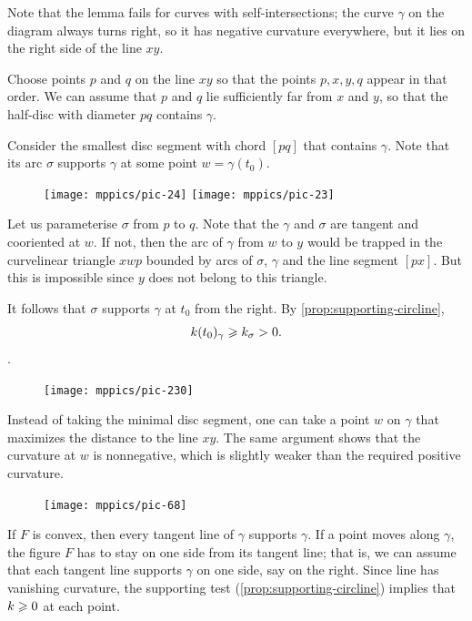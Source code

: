 Note that the lemma fails for curves with self-intersections;
the curve $\gamma$ on the diagram always turns right, 
so it has negative curvature everywhere, but it lies on the right side of the line $xy$.

Choose points $p$ and $q$ on the line $xy$
so that the points $p, x, y, q$ appear in that order.
We can assume that $p$ and $q$ lie sufficiently far from $x$ and $y$, so that the half-disc with diameter $pq$ contains $\gamma$.

Consider the smallest disc segment with chord $[pq]$ that contains $\gamma$.
Note that its arc $\sigma$ supports $\gamma$ at some point $w=\gamma(t_0)$.

\begin{figure}
\centering
\texttt{[image: mppics/pic-24]}
\bigskip
\texttt{[image: mppics/pic-23]}
\end{figure}

Let us parameterise $\sigma$ from $p$ to $q$.
Note that the $\gamma$ and $\sigma$ are tangent and cooriented at $w$.
If not, then the arc of $\gamma$ from $w$ to $y$ would be trapped in the curvelinear triangle $xwp$ bounded by arcs of $\sigma$, $\gamma$ and the line segment $[px]$.
But this is impossible since $y$ does not belong to this triangle.

It follows that $\sigma$ supports $\gamma$ at $t_0$ from the right.
By \ref{prop:supporting-circline}, 
\[k(t_0)_\gamma\geqslant k_\sigma >0.\].
\qeds

\begin{figure}
\vskip-6mm
\centering
\texttt{[image: mppics/pic-230]}
\vskip0mm
\end{figure}

Instead of taking the minimal disc segment, one can take a point $w$ on $\gamma$ that maximizes the distance to the line $xy$.
The same argument shows that the curvature at $w$ is nonnegative, which is slightly weaker than the required positive curvature.

\begin{figure}
\centering
\texttt{[image: mppics/pic-68]}
\vskip0mm
\end{figure}

If $F$ is convex, then every tangent line of $\gamma$ supports $\gamma$.
If a point moves along $\gamma$, the figure $F$ has to stay on one side from its tangent line;
that is, we can assume that each tangent line supports $\gamma$ on one side, say on the right.
Since line has vanishing curvature, the supporting test (\ref{prop:supporting-circline}) implies that $k\geqslant 0$ at each point.

